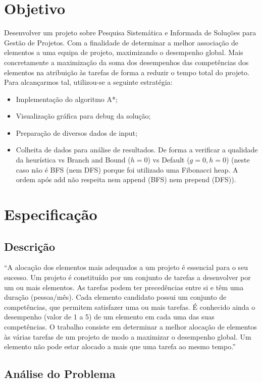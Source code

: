 \documentclass[a4paper,11pt]{article}
\begin{document}
\section{Objetivo}

Desenvolver um projeto sobre Pesquisa Sistemática e Informada de Soluções para Gestão de Projetos. Com a finalidade de determinar a melhor associação de elementos a uma equipa de projeto, maximizando o desempenho global. Mais concretamente a maximização da soma dos desempenhos das competências dos elementos na atribuição às tarefas de forma a reduzir o tempo total do projeto. Para alcançarmos tal, utilizou-se a seguinte estratégia:
\begin{itemize}
\item Implementação do algoritmo A*;
\item Visualização gráfica para debug da solução;
\item Preparação de diversos dados de input;
\item Colheita de dados para análise de resultados. De forma a verificar a qualidade da heurística vs Branch and Bound ($h = 0$) vs Default ($g = 0, h = 0$) (neste caso não é BFS (nem DFS) porque foi utilizado uma Fibonacci heap. A ordem após add não respeita nem append (BFS) nem prepend (DFS)).
\end{itemize}

\section{Especificação}	

\subsection{Descrição}

``A alocação dos elementos mais adequados a um projeto é essencial para o seu sucesso. Um projeto é constituído por um conjunto de tarefas a desenvolver por um ou mais elementos. As tarefas podem ter precedências entre si e têm uma duração (pessoa/mês). Cada elemento candidato possui um conjunto de competências, que permitem satisfazer uma ou mais tarefas. É conhecido ainda o desempenho (valor de 1 a 5) de um elemento em cada uma das suas competências. O trabalho consiste em determinar a melhor alocação de elementos às várias tarefas de um projeto de modo a maximizar o desempenho global. Um elemento não pode estar alocado a mais que uma tarefa ao mesmo tempo.''

\subsection{Análise do Problema}
\end{document}

